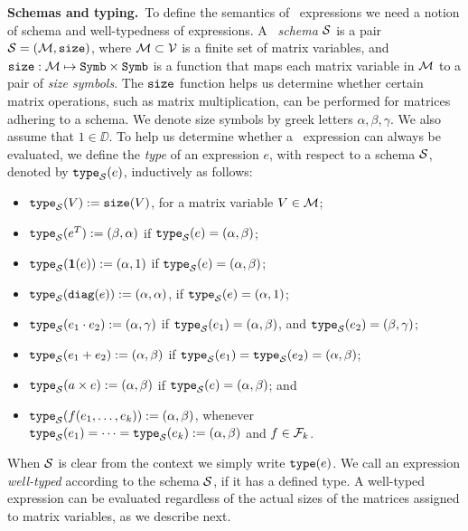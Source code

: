 \smallskip
\noindent
\textbf{Schemas and typing.}\,
To define the semantics of \lang\ expressions we need a notion of schema and well-typedness of expressions. A \lang\ \textit{schema} $\mathcal{S}$ is a pair $\mathcal{S}=(\mathcal{M},\texttt{size})$, where $\mathcal{M}\subset \mathcal{V}$ is a finite set of matrix variables, and $\texttt{size}: \mathcal{M} \mapsto \texttt{Symb}\times \texttt{Symb}$ is a function that maps each matrix variable in $\mathcal{M}$ to a pair of \textit{size symbols}. The $\texttt{size}$ function helps us determine whether certain matrix operations, such as matrix multiplication, can be performed for matrices adhering to a schema. 
We denote size symbols by greek letters $\alpha,\beta,\gamma$. We also assume that $1\in \DD$. 
To help us determine whether a \lang\ expression can always be evaluated, we define the \textit{type} of an expression $e$, with respect to a schema $\mathcal{S}$, denoted by $\texttt{type}_{\mathcal{S}}(e)$, inductively as follows:
\begin{itemize}
\item $\texttt{type}_{\mathcal{S}}(V):= \texttt{size}(V)$, for a matrix variable $V\in\mathcal{M}$;
\item $\texttt{type}_{\mathcal{S}}(e^T):= (\beta,\alpha)$ if $\texttt{type}_{\mathcal{S}}(e)=(\alpha,\beta)$;
\item $\texttt{type}_{\mathcal{S}}(\mathbf{1}(e)):= (\alpha,1)$ if $\texttt{type}_{\mathcal{S}}(e)=(\alpha,\beta)$;
\item $\texttt{type}_{\mathcal{S}}(\texttt{diag}(e)):= (\alpha,\alpha)$, if $\texttt{type}_{\mathcal{S}}(e)=(\alpha,1)$;
\item $\texttt{type}_{\mathcal{S}}(e_1 \cdot e_2):= (\alpha,\gamma)$ if  $\texttt{type}_{\mathcal{S}}(e_1)=(\alpha,\beta)$, and $\texttt{type}_{\mathcal{S}}(e_2)=(\beta,\gamma)$;
\item $\texttt{type}_{\mathcal{S}}(e_1 + e_2):=(\alpha,\beta)$ if $\texttt{type}_{\mathcal{S}}(e_1)=\texttt{type}_{\mathcal{S}}(e_2)=(\alpha,\beta)$;
\item $\texttt{type}_{\mathcal{S}}(a\times e):=(\alpha,\beta)$ if $\texttt{type}_{\mathcal{S}}(e)=(\alpha,\beta)$; and
\item $\texttt{type}_{\mathcal{S}}(f(e_1,\ldots ,e_k)):= (\alpha,\beta)$, whenever $\texttt{type}_{\mathcal{S}}(e_1) = \cdots = \texttt{type}_{\mathcal{S}}(e_k) := (\alpha,\beta)$ and $f\in\mathcal{F}_k$.
\end{itemize}
When $\mathcal{S}$ is clear from the context we simply write $\texttt{type}(e)$. We call an expression \textit{well-typed} according to the schema $\mathcal{S}$, if it has a defined type. 
A well-typed expression can be evaluated regardless of the actual sizes of the matrices assigned to matrix variables, as we describe next.

